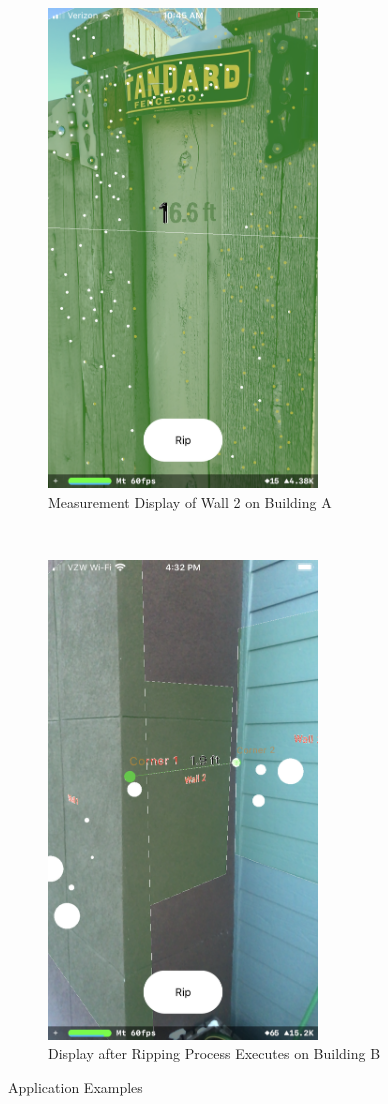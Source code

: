 \documentclass[final,3p]{CSP}
\begin{document}
\begin{figure}[t!]
    \centering
    \begin{subfigure}[t]{0.5\textwidth}
        \centering
        \includegraphics[height=5.0in]{measurement-example.PNG}
        \caption{Measurement Display of Wall 2 on Building A}
        \label{fig:bldam}
    \end{subfigure}%
    ~ 
    \begin{subfigure}[t]{0.5\textwidth}
        \centering
        \includegraphics[height=5.0in]{meas-bldb.PNG}
        \caption{Display after Ripping Process Executes on Building B}
        \label{fig:bldbm}
    \end{subfigure}
    \caption{Application Examples}
\end{figure}
\end{document}
